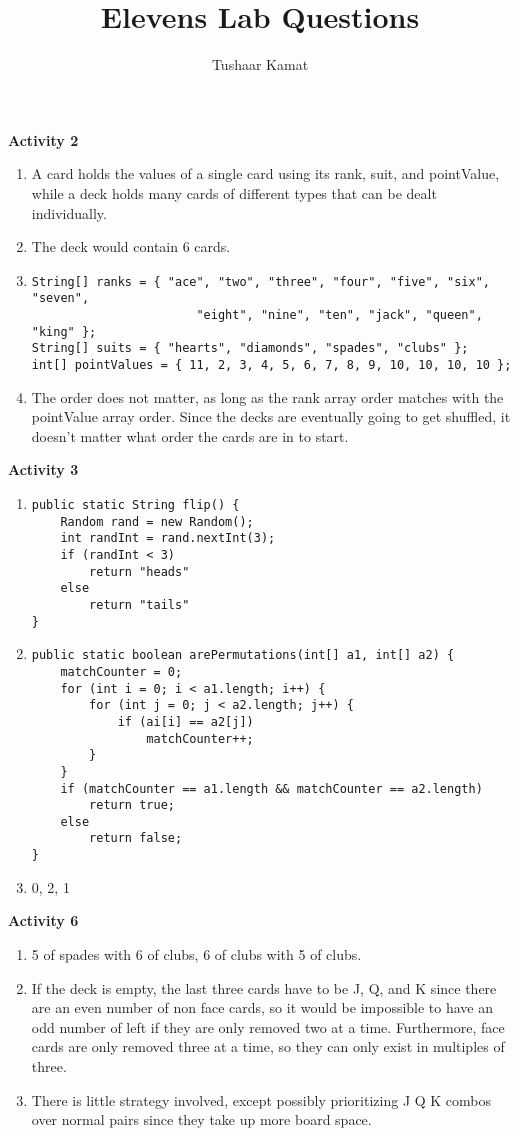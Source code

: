 \message{ !name(questions.tex)}\documentclass[12pt]{article}
\author{Tushaar Kamat}
\title{Elevens Lab Questions}
\begin{document}

\maketitle

\textbf{Activity 2}
\begin{enumerate}
  \item A card holds the values of a single card using its rank, suit, and
    pointValue, while a deck holds many cards of different types that can be
    dealt individually.
  \item The deck would contain 6 cards. 
  \item 
\begin{verbatim}
String[] ranks = { "ace", "two", "three", "four", "five", "six", "seven", 
                       "eight", "nine", "ten", "jack", "queen", "king" };
String[] suits = { "hearts", "diamonds", "spades", "clubs" };
int[] pointValues = { 11, 2, 3, 4, 5, 6, 7, 8, 9, 10, 10, 10, 10 };
\end{verbatim}
  \item The order does not matter, as long as the rank array order matches with
    the pointValue array order. Since the decks are eventually going to get
    shuffled, it doesn't matter what order the cards are in to start. 
\end{enumerate}

\textbf{Activity 3}
\begin{enumerate}
\item
\begin{verbatim}
public static String flip() {
    Random rand = new Random();
    int randInt = rand.nextInt(3);
    if (randInt < 3) 
        return "heads"
    else 
        return "tails"
}
\end{verbatim}
\item
\begin{verbatim}
public static boolean arePermutations(int[] a1, int[] a2) {
    matchCounter = 0;
    for (int i = 0; i < a1.length; i++) {
        for (int j = 0; j < a2.length; j++) {
            if (ai[i] == a2[j])
                matchCounter++;
        }
    }
    if (matchCounter == a1.length && matchCounter == a2.length)
        return true;
    else 
        return false;
}
\end{verbatim}
\item 0, 2, 1
\end{enumerate}

\textbf{Activity 6}
\begin{enumerate}
\item 5 of spades with 6 of clubs, 6 of clubs with 5 of clubs. 
\item If the deck is empty, the last three cards have to be J, Q, and K since
  there are an even number of non face cards, so it would be impossible to have
  an odd number of left if they are only removed two at a time. Furthermore,
  face cards are only removed three at a time, so they can only exist in
  multiples of three.
\item There is little strategy involved, except possibly prioritizing J Q K
  combos over normal pairs since they take up more board space.
\end{enumerate}
\end{document}
